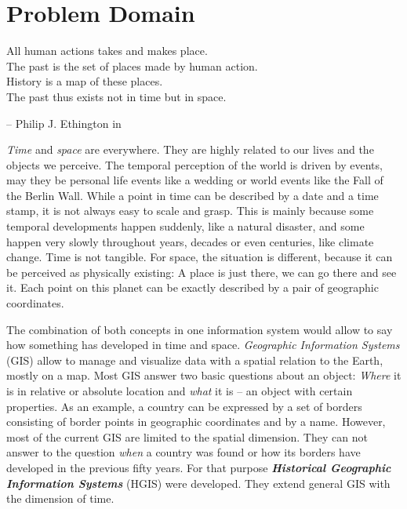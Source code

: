 
\section{Problem Domain} %
\label{sec:problem_domain}

\begin{quoteit}
  All human actions takes and makes place. \\
  The past is the set of places made by human action. \\
  History is a map of these places. \\
  The past thus exists not in time but in space.
\end{quoteit}
\hfill -- Philip J. Ethington in \cite[précis]{citeTakeMakePlace}

\emph{Time} and \emph{space} are everywhere. They are highly related to our lives and the objects we perceive. The temporal perception of the world is driven by events, may they be personal life events like a wedding or world events like the Fall of the Berlin Wall. While a point in time can be described by a date and a time stamp, it is not always easy to scale and grasp. This is mainly because some temporal developments happen suddenly, like a natural disaster, and some happen very slowly throughout years, decades or even centuries, like climate change. Time is not tangible. For space, the situation is different, because it can be perceived as physically existing: A place is just there, we can go there and see it. Each point on this planet can be exactly described by a pair of geographic coordinates.

The combination of both concepts in one information system would allow to say how something has developed in time and space. \emph{Geographic Information Systems} (GIS) allow to manage and visualize data with a spatial relation to the Earth, mostly on a map. Most GIS answer two basic questions about an object: \emph{Where} it is in relative or absolute location and \emph{what} it is -- an object with certain properties. As an example, a country can be expressed by a set of borders consisting of border points in geographic coordinates and by a name. However, most of the current GIS are limited to the spatial dimension. They can not answer to the question \emph{when} a country was found or how its borders have developed in the previous fifty years. For that purpose \textbf{\emph{Historical Geographic Information Systems}} (HGIS) were developed. They extend general GIS with the dimension of time.

